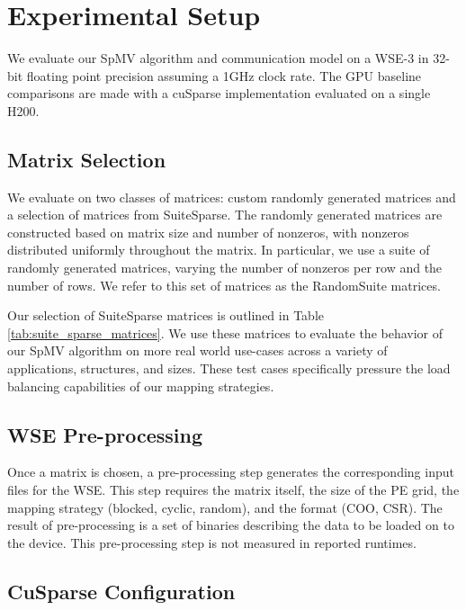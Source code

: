 \documentclass[conference]{IEEEtran}
\begin{document}
\section{Experimental Setup}
We evaluate our SpMV algorithm and communication model on a WSE-3 in 32-bit floating point precision assuming a 1GHz clock rate. The GPU baseline comparisons
are made with a cuSparse implementation evaluated on a single H200.
\subsection{Matrix Selection}
We evaluate on two classes of matrices: custom randomly generated matrices and a selection of matrices from SuiteSparse.
The randomly generated matrices are constructed based on matrix size and number of nonzeros, with nonzeros distributed uniformly throughout the matrix. In particular, we use a suite of randomly generated matrices, varying the number of nonzeros per row and the number of rows. We refer to this set of matrices as the RandomSuite matrices.




Our selection of SuiteSparse matrices is outlined in Table \ref{tab:suite_sparse_matrices}. We use these matrices to evaluate the behavior of our SpMV algorithm on more real world use-cases
across a variety of applications, structures, and sizes. These test cases specifically pressure the load balancing capabilities of our mapping strategies.
\subsection{WSE Pre-processing}
Once a matrix is chosen, a pre-processing step generates the corresponding input files for the WSE.
This step requires the matrix itself, the size of the PE grid, the mapping strategy (blocked, cyclic, random), and the format (COO, CSR).
The result of pre-processing is a set of binaries describing the data to be loaded on to the device.
This pre-processing step is not measured in reported runtimes.

\subsection{CuSparse Configuration}
\end{document}
